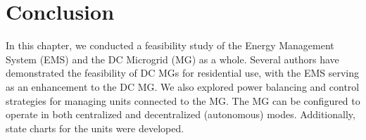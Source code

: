 \section{Conclusion}
In this chapter, we conducted a feasibility study of the Energy Management System (EMS) and the DC Microgrid (MG) as a whole. Several authors have demonstrated the feasibility of DC MGs for residential use, with the EMS serving as an enhancement to the DC MG. We also explored power balancing and control strategies for managing units connected to the MG. The MG can be configured to operate in both centralized and decentralized (autonomous) modes. Additionally, state charts for the units were developed.\par

